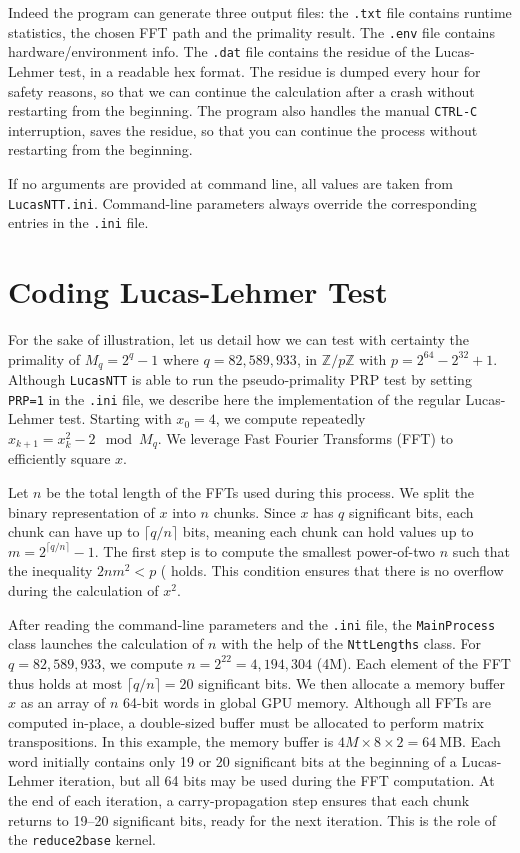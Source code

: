 \documentclass{article}
\begin{document}
Indeed the program can generate three output files: the \texttt{.txt} file contains runtime statistics, the chosen FFT path and the primality result. The \texttt{.env} file contains hardware/environment info. The \texttt{.dat} file contains the residue of the Lucas-Lehmer test, in a readable hex format. The residue is dumped every hour for safety reasons, so that we can continue the calculation after a crash without restarting from the beginning. The program also handles the manual \texttt{CTRL-C} interruption, saves the residue, so that you can continue the process without restarting from the beginning.

If no arguments are provided at command line, all values are taken from \texttt{LucasNTT.ini}. Command-line parameters always override the corresponding entries in the \texttt{.ini} file.

\section{Coding Lucas-Lehmer Test}

For the sake of illustration, let us detail how we can test with certainty the primality of $M_q = 2^q - 1$ where $q = 82,\!589,\!933$, in $\mathbb{Z}/p\mathbb{Z}$ with $p = 2^{64} - 2^{32} + 1$. Although \texttt{LucasNTT} is able to run the pseudo-primality PRP test by setting \texttt{PRP=1} in the \texttt{.ini} file, we describe here the implementation of the regular Lucas-Lehmer test. Starting with $x_0 = 4$, we compute repeatedly $x_{k+1} = x_k^2 - 2 \mod M_q$. We leverage Fast Fourier Transforms (FFT) to efficiently square $x$.

Let $n$ be the total length of the FFTs used during this process. We split the binary representation of $x$ into $n$ chunks. Since $x$ has $q$ significant bits, each chunk can have up to $\lceil q / n \rceil$ bits, meaning each chunk can hold values up to
$m = 2^{\lceil q / n \rceil} - 1$.
The first step is to compute the smallest power-of-two $n$ such that the inequality
$2nm^2 < p$ (\cite{LucasNTT_multiplication} holds. This condition ensures that there is no overflow during the calculation of $x^2$.

After reading the command-line parameters and the \texttt{.ini} file, the \texttt{MainProcess} class launches the calculation of $n$ with the help of the \texttt{NttLengths} class. For $q = 82,\!589,\!933$, we compute $n = 2^{22} = 4,\!194,\!304$ (4M). Each element of the FFT thus holds at most $\lceil q / n \rceil = 20$ significant bits. We then allocate a memory buffer $x$ as an array of $n$ 64-bit words in global GPU memory. Although all FFTs are computed in-place, a double-sized buffer must be allocated to perform matrix transpositions. In this example, the memory buffer is
$4M \times 8 \times 2 = 64\ \text{MB}$.
Each word initially contains only 19 or 20 significant bits at the beginning of a Lucas-Lehmer iteration, but all 64 bits may be used during the FFT computation. At the end of each iteration, a carry-propagation step ensures that each chunk returns to 19--20 significant bits, ready for the next iteration. This is the role of the \texttt{reduce2base} kernel.
\end{document}
